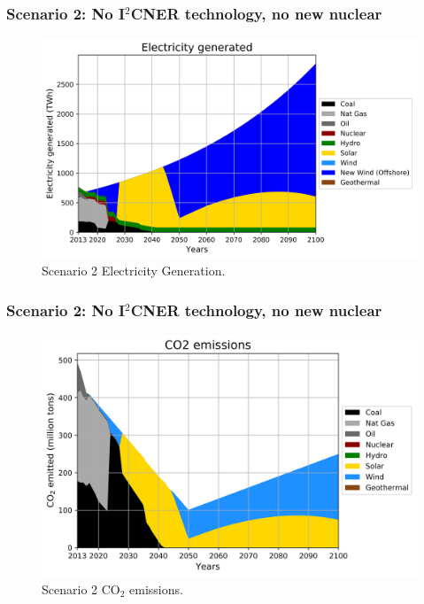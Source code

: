 \begin{frame}
  \frametitle{Scenario 2: No I$^2$CNER technology, no new nuclear}
  \begin{figure}[htbp!]
    \begin{center}
      \includegraphics[scale=0.5]{./images/conv_nonuc_elc}
    \end{center}
          \caption{Scenario 2 Electricity Generation.}
    \label{s2e}
  \end{figure}
\end{frame}

\begin{frame}
  \frametitle{Scenario 2: No I$^2$CNER technology, no new nuclear}
  \begin{figure}[htbp!]
    \begin{center}
      \includegraphics[scale=0.5]{./images/conv_nonuc_co2}
    \end{center}
          \caption{Scenario 2 CO$_2$ emissions.}
    \label{s2c}
  \end{figure}

\end{frame}
